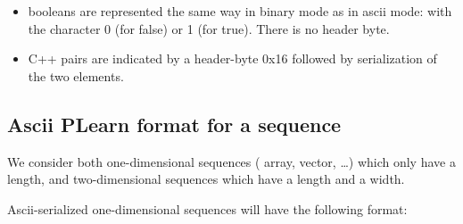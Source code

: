 \documentclass[11pt]{book}
\begin{document}
\begin{itemize}
\item booleans are represented the same way in binary mode as in ascii mode: with the character 0 (for false) or 1 (for true). There is no header byte.
\item C++ pairs are indicated by a header-byte 0x16 followed by serialization of the two elements.
\end{itemize}


\subsection{Ascii PLearn format for a sequence}
\label{ascii-sequence}

We consider both one-dimensional sequences ( array, vector, \ldots) which only have a length,
and two-dimensional sequences which have a length and a width.

Ascii-serialized one-dimensional sequences will have the following format:
\end{document}
